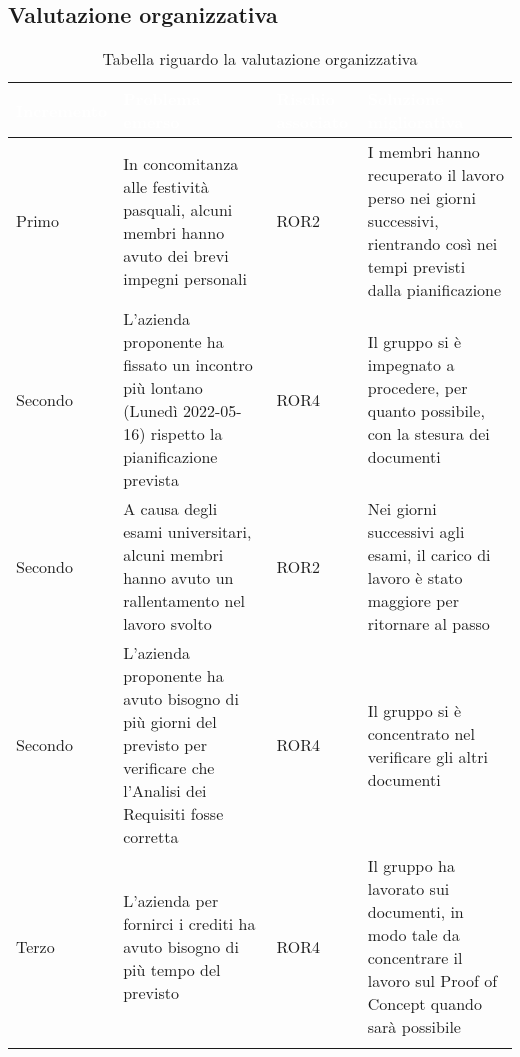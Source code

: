 \subsection{Valutazione organizzativa}
{
    \setlength{\freewidth}{\dimexpr\textwidth-10\tabcolsep}
    \renewcommand{\arraystretch}{1.5}
    \centering
    \setlength{\aboverulesep}{0pt}
    \setlength{\belowrulesep}{0pt}
    \begin{longtable}{C{.25\freewidth} C{.257\freewidth} C{.16\freewidth} C{.4\freewidth}}
       \toprule
    \textcolor{white}{\textbf{Incremento}}&
    \textcolor{white}{\textbf{Problema emerso}}&
    \textcolor{white}{\textbf{Rischio associato}}&
    \textcolor{white}{\textbf{Soluzione migliorativa}}\\	
    \toprule
    \endhead
    
   Primo & In concomitanza alle festività pasquali, alcuni membri hanno avuto dei brevi impegni personali & 
          ROR2 &I membri hanno recuperato il lavoro perso nei giorni successivi, rientrando così nei tempi previsti dalla pianificazione \\
   Secondo & L'azienda proponente ha fissato un incontro più lontano (Lunedì 2022-05-16) rispetto la pianificazione prevista &
            ROR4 & Il gruppo si è impegnato a procedere, per quanto possibile, con la stesura dei documenti \\
   Secondo & A causa degli esami universitari, alcuni membri hanno avuto un rallentamento nel lavoro svolto & 
           ROR2 & Nei giorni successivi agli esami, il carico di lavoro è stato maggiore per ritornare al passo \\
   Secondo & L'azienda proponente ha avuto bisogno di più giorni del previsto per verificare che l'Analisi dei Requisiti fosse corretta & ROR4 &
            Il gruppo si è concentrato nel verificare gli altri documenti \\
   Terzo & L'azienda per fornirci i crediti ha avuto bisogno di più tempo del previsto & ROR4 & Il gruppo ha lavorato sui documenti, in modo tale da concentrare il lavoro sul Proof of Concept quando sarà possibile \\
   \bottomrule
   \caption{Tabella riguardo la valutazione organizzativa}
   \end{longtable}
}

\newpage
